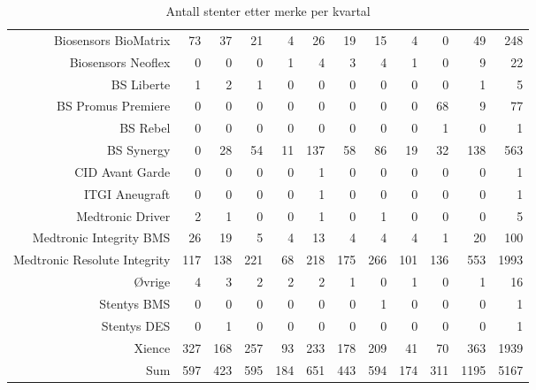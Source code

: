 \documentclass[presentation,xcolor=pdftex,dvipsnames,table]{beamer}
\begin{document}
\begin{frame}
\begin{tiny}
\begin{table}[ht]
\begin{tabular}{rrrrrrrrrrrr}
  Biosensors BioMatrix & 73 & 37 & 21 & 4 & 26 & 19 & 15 & 4 & 0 & 49 & 248 \\ 
  Biosensors Neoflex & 0 & 0 & 0 & 1 & 4 & 3 & 4 & 1 & 0 & 9 & 22 \\ 
  BS Liberte & 1 & 2 & 1 & 0 & 0 & 0 & 0 & 0 & 0 & 1 & 5 \\ 
  BS Promus Premiere & 0 & 0 & 0 & 0 & 0 & 0 & 0 & 0 & 68 & 9 & 77 \\ 
  BS Rebel & 0 & 0 & 0 & 0 & 0 & 0 & 0 & 0 & 1 & 0 & 1 \\ 
  BS Synergy & 0 & 28 & 54 & 11 & 137 & 58 & 86 & 19 & 32 & 138 & 563 \\ 
  CID Avant Garde & 0 & 0 & 0 & 0 & 1 & 0 & 0 & 0 & 0 & 0 & 1 \\ 
  ITGI Aneugraft & 0 & 0 & 0 & 0 & 1 & 0 & 0 & 0 & 0 & 0 & 1 \\ 
  Medtronic Driver & 2 & 1 & 0 & 0 & 1 & 0 & 1 & 0 & 0 & 0 & 5 \\ 
  Medtronic Integrity BMS & 26 & 19 & 5 & 4 & 13 & 4 & 4 & 4 & 1 & 20 & 100 \\ 
  Medtronic Resolute Integrity & 117 & 138 & 221 & 68 & 218 & 175 & 266 & 101 & 136 & 553 & 1993 \\ 
  Øvrige & 4 & 3 & 2 & 2 & 2 & 1 & 0 & 1 & 0 & 1 & 16 \\ 
  Stentys BMS & 0 & 0 & 0 & 0 & 0 & 0 & 1 & 0 & 0 & 0 & 1 \\ 
  Stentys DES & 0 & 1 & 0 & 0 & 0 & 0 & 0 & 0 & 0 & 0 & 1 \\ 
  Xience & 327 & 168 & 257 & 93 & 233 & 178 & 209 & 41 & 70 & 363 & 1939 \\ 
  Sum & 597 & 423 & 595 & 184 & 651 & 443 & 594 & 174 & 311 & 1195 & 5167 \\ 
   \bottomrule
\end{tabular}
\caption{Antall stenter etter merke per kvartal} 
\end{table}\end{tiny}
\end{frame}
\end{document}
